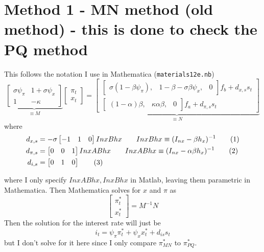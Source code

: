 \documentclass[11pt]{article}
\renewcommand{\[}{\begin{equation}}
\renewcommand{\]}{\end{equation}}
\newcommand\numberthis{\addtocounter{equation}{1}\tag{\theequation}} %
\begin{document}
\section{Method 1 - MN method (old method) - this is done to check the PQ method}
This follows the notation I use in Mathematica (\texttt{materials12e.nb})
\begin{equation}
\underbrace{\begin{bmatrix} \sigma\psi_{\pi}&  1+\sigma\psi_x\\ 1& -\kappa \end{bmatrix}}_{\equiv M}\begin{bmatrix} \pi_t \\ x_t \end{bmatrix} = \underbrace{\begin{bmatrix} \begin{bmatrix} \sigma(1-\beta\psi_{\pi}), &1-\beta-\sigma\beta\psi_x ,&0 \end{bmatrix}f_b +d_{x,s} s_t \\ \begin{bmatrix} (1-\alpha)\beta, &\kappa\alpha\beta ,& 0 \end{bmatrix} f_a +d_{\pi,s} s_t \end{bmatrix}}_{\equiv N}
\end{equation}
where 
\begin{align*}
 d_{x,s} & =  -\sigma\begin{bmatrix} -1 &1 & 0 \end{bmatrix}InxBhx \quad \quad InxBhx \equiv (I_{nx}-\beta h_x)^{-1} \numberthis \\
 d_{\pi,s} & =  \begin{bmatrix} 0&0 & 1  \end{bmatrix}InxABhx \quad \quad InxABhx \equiv (I_{nx}-\alpha\beta h_x)^{-1} \numberthis \\
  d_{i,s} & =  \begin{bmatrix} 0 &1 & 0  \end{bmatrix} \numberthis
\end{align*}

where I only specify $InxABhx, InxBhx$ in Matlab, leaving them parametric in Mathematica. Then Mathematica solves for $x$ and $\pi$ as \begin{equation}
\begin{bmatrix} \pi_t^* \\ x_t^* \end{bmatrix} = M^{-1}N \label{MN}
\end{equation}
Then the solution for the interest rate will just be
\begin{equation}
i_t = \psi_{\pi}\pi_t^* + \psi_{x} x_t^*  +d_{is} s_t
\end{equation}
but I don't solve for it here since I only compare $\pi^*_{MN}$ to $\pi^*_{PQ}$.
\end{document}
